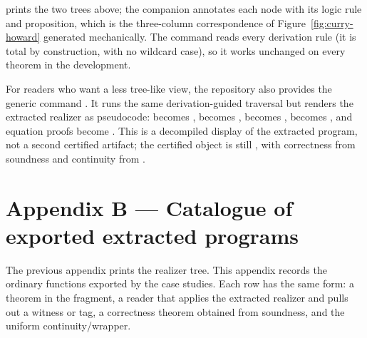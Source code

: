 \documentclass[11pt]{article}
\begin{document}
\begin{center}
\end{center}

\noindent
prints the two trees above; the companion  annotates each node
with its logic rule and proposition, which is the three-column correspondence of
Figure~\ref{fig:curry-howard} generated mechanically. The command reads every
derivation rule (it is total by construction, with no wildcard case), so it works
unchanged on every theorem in the development.

For readers who want a less tree-like view, the repository also provides the
generic command . It runs the same derivation-guided traversal
but renders the extracted realizer as pseudocode:  becomes
,  becomes ,
 becomes ,  becomes
, and equation proofs become . This is a
decompiled display of the extracted program, not a second certified artifact;
the certified object is still , with correctness from
soundness and continuity from .

\section{Appendix B --- Catalogue of exported extracted programs}
\label{app:catalogue}

The previous appendix prints the realizer tree. This appendix records the
ordinary functions exported by the case studies. Each row has the same form:
a theorem in the fragment, a reader that applies the extracted realizer and
pulls out a witness or tag, a correctness theorem obtained from soundness, and
the uniform continuity/\CtQ wrapper.
\end{document}
